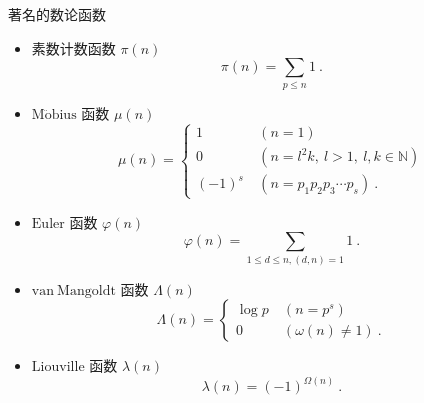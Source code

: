 \begin{example}{著名的数论函数}
\begin{itemize}
\item 素数计数函数 $\pi(n)$
\begin{equation}
\pi(n)=\sum_{p\leq n} 1~.
\end{equation}
\item $\mathrm{M\ddot{o}bius}$ 函数 $\mu(n)$
\begin{equation}
\mu(n)=
\begin{cases}
1&\ (n=1)\\
0&\ (n=l^2k,\ l>1,\ l,k\in\mathbb{N})\\
(-1)^s&\ (n=p_1p_2p_3\cdots p_s)~.
\end{cases}
\end{equation}
\item $\mathrm{Euler}$ 函数 $\varphi(n)$
\begin{equation}
\varphi(n)=\sum_{1\leq d\leq n,(d,n)=1}1~.
\end{equation}
\item $\mathrm{van\ Mangoldt}$ 函数 $\Lambda(n)$
\begin{equation}
\varLambda(n)=
\begin{cases}
\log p&\ (n=p^s)\\
0&\ (\omega(n)\neq 1)~.
\end{cases}
\end{equation}
\item $\mathrm{Liouville}$ 函数 $\lambda(n)$
\begin{equation}
\lambda(n)=(-1)^{\Omega(n)}~.
\end{equation}
\end{itemize}

\end{example}